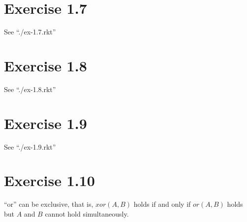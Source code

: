 \documentclass[11pt,a4paper]{article}
\begin{document}
\section{Exercise 1.7}

See ``./ex-1.7.rkt''

\section{Exercise 1.8}

See ``./ex-1.8.rkt''

\section{Exercise 1.9}

See ``./ex-1.9.rkt''

\section{Exercise 1.10}

``or'' can be exclusive, that is, $xor(A,B)$ holds if and only if
$or(A,B)$ holds but $A$ and $B$ cannot hold simultaneously. 
\end{document}
